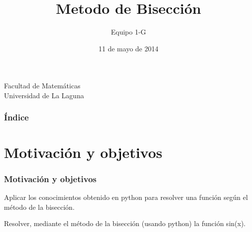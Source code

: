 \documentclass{beamer}
\title[Método de Bisección]{Metodo de Bisección}
\author[Equipo 1 G]{Equipo 1-G}
\date[11-05-2014]{11 de mayo de 2014}
\begin{document}
  
\begin{frame}

  \begin{small}
    \begin{center}
     Facultad de Matemáticas \\
     Universidad de La Laguna
    \end{center}
  \end{small}

\end{frame}

\begin{frame}
  \frametitle{Índice}  
  \tableofcontents[pausesections]
\end{frame}


\section{Motivación y objetivos}
\begin{frame}

\frametitle{Motivación y objetivos}
\begin{Motivation}
    Aplicar los conocimientos obtenido en python para resolver una función según el método de la bisección.
\end{Motivation}

\begin{Objetivos}
     Resolver, mediante el método de la bisección (usando python) la función sin(x).
\end{Objetivos}

\end{frame}
\end{document}
